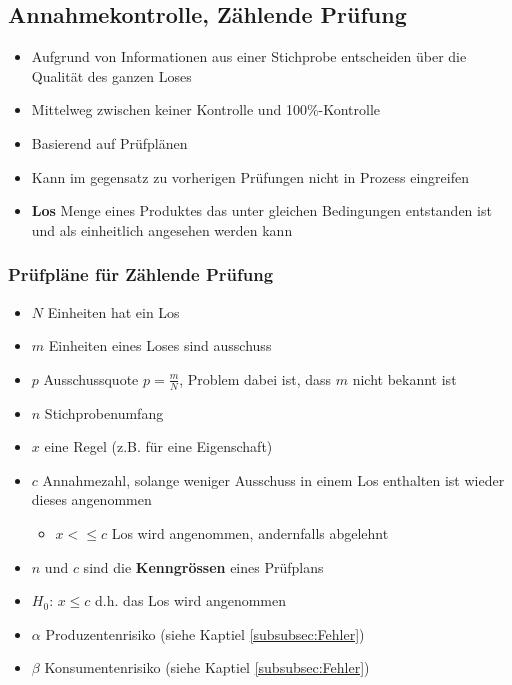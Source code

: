 \subsection{Annahmekontrolle, Zählende Prüfung}
\begin{itemize}
	\item Aufgrund von Informationen aus einer Stichprobe entscheiden über die Qualität des ganzen Loses
	\item Mittelweg zwischen keiner Kontrolle und 100\%-Kontrolle
	\item Basierend auf Prüfplänen
	\item Kann im gegensatz zu vorherigen Prüfungen nicht in Prozess eingreifen
	\item \textbf{Los} Menge eines Produktes das unter gleichen Bedingungen entstanden ist und als einheitlich angesehen werden kann
\end{itemize}

\subsubsection{Prüfpläne für Zählende Prüfung}
\begin{itemize}
	\item $N$ Einheiten hat ein Los
	\item $m$ Einheiten eines Loses sind ausschuss
	\item $p$ Ausschussquote $p=\frac{m}{N}$, Problem dabei ist, dass $m$ nicht bekannt ist
	\item $n$ Stichprobenumfang
	\item $x$ eine Regel (z.B. für eine Eigenschaft)
	\item $c$ Annahmezahl, solange weniger Ausschuss in einem Los enthalten ist wieder dieses angenommen
	\begin{itemize}
		\item $x<\leq c$ Los wird angenommen, andernfalls abgelehnt
	\end{itemize}
	\item $n$ und $c$ sind die \textbf{Kenngrössen} eines Prüfplans
	\item $H_0$: $x\leq c$ d.h. das Los wird angenommen
	\item $\alpha$ Produzentenrisiko (siehe Kaptiel \ref{subsubsec:Fehler})
	\item $\beta$ Konsumentenrisiko (siehe Kaptiel \ref{subsubsec:Fehler})
\end{itemize}

